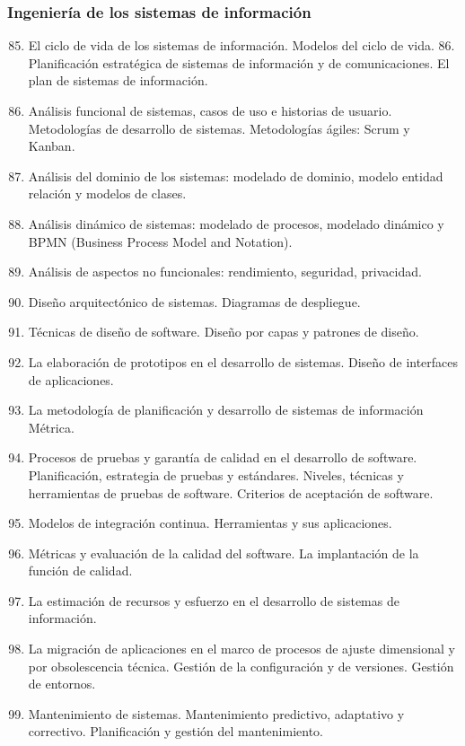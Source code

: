 	\subsubsection{Ingeniería de los sistemas de información}
	\begin{enumerate}
		\setcounter{enumi}{84}
		\item El ciclo de vida de los sistemas de información. Modelos del ciclo de vida. 86. Planificación estratégica de sistemas de información y de comunicaciones. El plan de sistemas de información.
		\item Análisis funcional de sistemas, casos de uso e historias de usuario. Metodologías de desarrollo de sistemas. Metodologías ágiles: Scrum y Kanban.
		\item Análisis del dominio de los sistemas: modelado de dominio, modelo entidad relación y modelos de clases.
		\item Análisis dinámico de sistemas: modelado de procesos, modelado dinámico y BPMN (Business Process Model and Notation).
		\item Análisis de aspectos no funcionales: rendimiento, seguridad, privacidad.
		\item Diseño arquitectónico de sistemas. Diagramas de despliegue.
		\item Técnicas de diseño de software. Diseño por capas y patrones de diseño.
		\item La elaboración de prototipos en el desarrollo de sistemas. Diseño de interfaces de aplicaciones.
		\item La metodología de planificación y desarrollo de sistemas de información Métrica.
		\item Procesos de pruebas y garantía de calidad en el desarrollo de software. Planificación, estrategia de pruebas y estándares. Niveles, técnicas y herramientas de pruebas de software. Criterios de aceptación de software.
		\item Modelos de integración continua. Herramientas y sus aplicaciones.
		\item Métricas y evaluación de la calidad del software. La implantación de la función de calidad.
		\item La estimación de recursos y esfuerzo en el desarrollo de sistemas de información.
		\item La migración de aplicaciones en el marco de procesos de ajuste dimensional y por obsolescencia técnica. Gestión de la configuración y de versiones. Gestión de entornos.
		\item Mantenimiento de sistemas. Mantenimiento predictivo, adaptativo y correctivo. Planificación y gestión del mantenimiento.

\end{enumerate}
